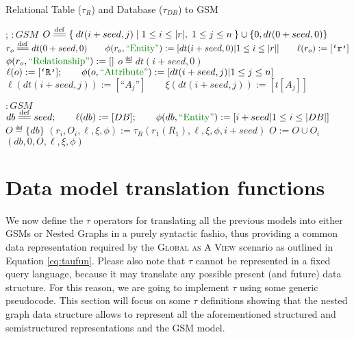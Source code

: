 \begin{algorithm}[!t]
	\caption{Relational Table ($\tau_R$) and Database ($\tau_{DB}$) to GSM}\label{alg:reltonested}
	{
		\begin{minipage}{\linewidth}
			\begin{algorithmic}[1]
				;
				\State
				 $\colon GSM$ 
				\State $O\overset{\mathrm{def}}{=\mathrel{\mkern-3mu}=}\Set{dt(i+seed, j)|1\leq i\leq |r|,\;1\leq j\leq n}\cup\{0, dt(0+seed,0)\}$
				\State $r_o\eqdef dt(0+seed, 0)\qquad \phi(r_o,\ONTA):=[dt(i+seed,0)|1\leq i\leq |r|]\qquad \ell(r_o):=[\texttt{`r'}]$
				\State $\phi(r_o,\RELA):=[]$  
				\State $o\eqdef dt(i+seed, 0)$
				\State $\ell(o):=[\texttt{`R'}];\qquad \phi(o,\ATTR):=[dt(i+seed, j)| 1\leq j\leq n]$
				\State $\ell(dt(i+seed, j)):=[\texttt{``}{A_j}\texttt{''}]\qquad \xi(dt(i+seed, j)):=[t[A_j]]$
				\EndFor 
				\EndFor
				\State {}
				\EndFunction
				
				\State
				 $\colon GSM$ 
				\State $db\eqdef seed;\qquad \ell(db):=[DB];\qquad \phi(db,\ONTA):=[i+seed|1\leq i\leq |DB|]$
				\State $O \eqdef\{db\}$
				\State $(r_i,O_i,\ell,\xi,\phi):=\tau_R(r_1(R_1),\ell,\xi,\phi,i+seed)$
				\State $O:= O\cup O_i$
				\EndFor
				\State \Return $(db,0,O,\ell,\xi,\phi)$
				\EndFunction
			\end{algorithmic}
	\end{minipage}}
\end{algorithm}
\section{Data model translation functions}\label{sec:tautonesting}
We now define  the $\tau$ operators for translating all the previous models into either GSMs or Nested Graphs in a purely syntactic fashio, thus providing a common data representation required by the \textsc{Global as A View} scenario as outlined in Equation \vref{eq:taufun}. Please also note that $\tau$ cannot be represented in a fixed query language, because it may translate any possible present (and future) data structure. For this reason, we are going to implement $\tau$ using some generic pseudocode. This section will focus on some $\tau$ definitions showing that the nested graph data structure allows to represent all the aforementioned structured and semistructured representations and the GSM model.

